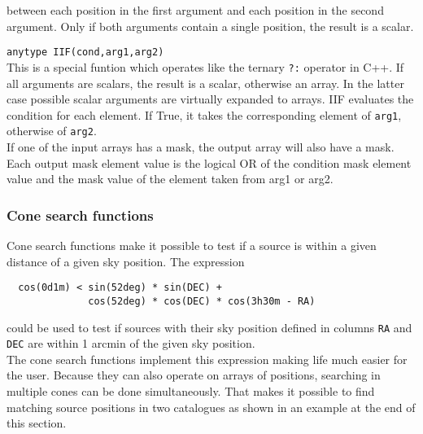 \begin{description}
    between each position in the first argument and each position in
    the second argument. Only if both arguments contain a single
    position, the result is a scalar.
  \item[] \texttt{anytype IIF(cond,arg1,arg2)}\\
    This is a special funtion which operates like the ternary \texttt{?:}
    operator in C++. 
    If all arguments are scalars, the result is a scalar, otherwise
    an array. In the latter case possible scalar arguments are
    virtually expanded to arrays.
    IIF evaluates the condition for each element. If True, it takes
    the corresponding element of \texttt{arg1}, otherwise of
    \texttt{arg2}.
    \\If one of the input arrays has a mask, the output array will
    also have a mask. Each output mask element value is the logical OR of the
    condition mask element value and the mask value of the element taken
    from arg1 or arg2.
\end{description}

\subsubsection{\label{TAQL:CONESEARCH}Cone search functions}
Cone search functions make it possible to test if a source is
within a given distance of a given sky position. The expression
\begin{verbatim}
  cos(0d1m) < sin(52deg) * sin(DEC) +
              cos(52deg) * cos(DEC) * cos(3h30m - RA)
\end{verbatim}
could be used to test if sources with their sky position defined
in columns \texttt{RA} and \texttt{DEC} are within 1 arcmin of the
given sky position.
\\The cone search functions implement this expression making life much
easier for the user. Because they
can also operate on arrays of positions, searching in
multiple cones can be done simultaneously. That makes it
possible to find matching source positions in two catalogues as shown
in an example at the end of this section.

